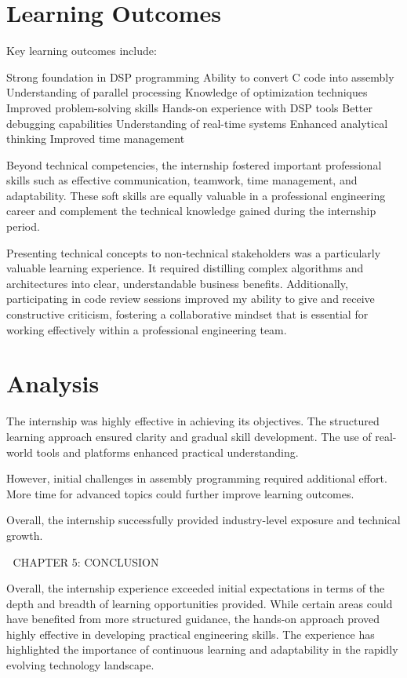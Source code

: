 \documentclass[12pt,a4paper]{report}
\begin{document}
\section{Learning Outcomes}

Key learning outcomes include:


Strong foundation in DSP programming Ability to convert C code into assembly Understanding of parallel processing Knowledge of optimization techniques Improved problem-solving skills Hands-on experience with DSP tools Better debugging capabilities Understanding of real-time systems Enhanced analytical thinking Improved time management


Beyond technical competencies, the internship fostered important professional skills such as effective communication, teamwork, time management, and adaptability. These soft skills are equally valuable in a professional engineering career and complement the technical knowledge gained during the internship period.


Presenting technical concepts to non-technical stakeholders was a particularly valuable learning experience. It required distilling complex algorithms and architectures into clear, understandable business benefits. Additionally, participating in code review sessions improved my ability to give and receive constructive criticism, fostering a collaborative mindset that is essential for working effectively within a professional engineering team.


\section{Analysis}

The internship was highly effective in achieving its objectives. The structured learning approach ensured clarity and gradual skill development. The use of real-world tools and platforms enhanced practical understanding.


However, initial challenges in assembly programming required additional effort. More time for advanced topics could further improve learning outcomes.


Overall, the internship successfully provided industry-level exposure and technical growth.


🔷 CHAPTER 5: CONCLUSION


Overall, the internship experience exceeded initial expectations in terms of the depth and breadth of learning opportunities provided. While certain areas could have benefited from more structured guidance, the hands-on approach proved highly effective in developing practical engineering skills. The experience has highlighted the importance of continuous learning and adaptability in the rapidly evolving technology landscape.
\end{document}
